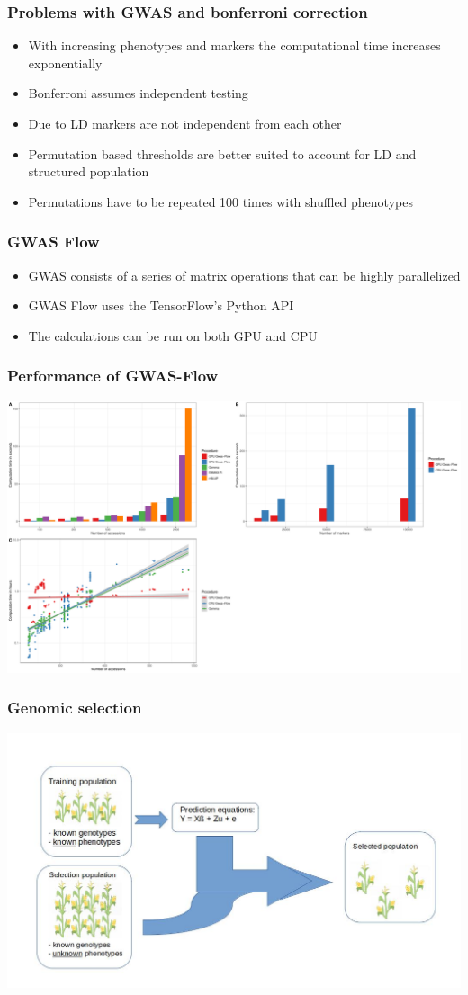 \documentclass{beamer}
\begin{document}
\begin{frame}
  \frametitle{Problems with GWAS and bonferroni correction}
  \begin{itemize}[<+->]
  \item With increasing phenotypes and markers the computational time increases exponentially
  \item Bonferroni assumes independent testing
  \item Due to LD markers are not independent from each other
  \item Permutation based thresholds are better suited to account for LD and structured population
  \item Permutations have to be repeated 100 times with shuffled phenotypes
  \end{itemize}
\end{frame}

\begin{frame}
  \frametitle{GWAS Flow}
  \begin{itemize}[<+->]
  \item GWAS consists of a series of matrix operations that can be highly parallelized
  \item GWAS Flow uses the TensorFlow's Python API 
  \item The calculations can be run on both GPU and CPU 
  \end{itemize}
\end{frame}

\begin{frame}
  \frametitle{Performance of GWAS-Flow }
  \includegraphics[height=.8\textheight,width=.9\textwidth]{final_plot2.pdf}
\end{frame}


\begin{frame}
  \frametitle{Genomic selection}
  \includegraphics[height=.8\textheight,width=.9\textwidth]{gs}
\end{frame}
\end{document}
